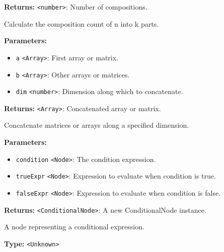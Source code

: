 \documentclass[12pt,a4paper]{article}
\begin{document}
\noindent \textbf{Returns:} \texttt{<number>}: Number of compositions.

\noindent Calculate the composition count of n into k parts.

\vspace{5mm}
\noindent {}


\noindent \textbf{Parameters:}
\begin{itemize}
  \item \texttt{a} \texttt{<Array>}: First array or matrix.
  \item \texttt{b} \texttt{<Array>}: Other arrays or matrices.
  \item \texttt{dim} \texttt{<number>}: Dimension along which to concatenate.
\end{itemize}

\noindent \textbf{Returns:} \texttt{<Array>}: Concatenated array or matrix.

\noindent Concatenate matrices or arrays along a specified dimension.

\vspace{5mm}
\noindent {}


\noindent \textbf{Parameters:}
\begin{itemize}
  \item \texttt{condition} \texttt{<Node>}: The condition expression.
  \item \texttt{trueExpr} \texttt{<Node>}: Expression to evaluate when condition is true.
  \item \texttt{falseExpr} \texttt{<Node>}: Expression to evaluate when condition is false.
\end{itemize}

\noindent \textbf{Returns:} \texttt{<ConditionalNode>}: A new ConditionalNode instance.

\noindent A node representing a conditional expression.

\vspace{5mm}
\noindent {}\vspace{4mm}


\noindent \textbf{Type:} \texttt{<Unknown>}
\end{document}
